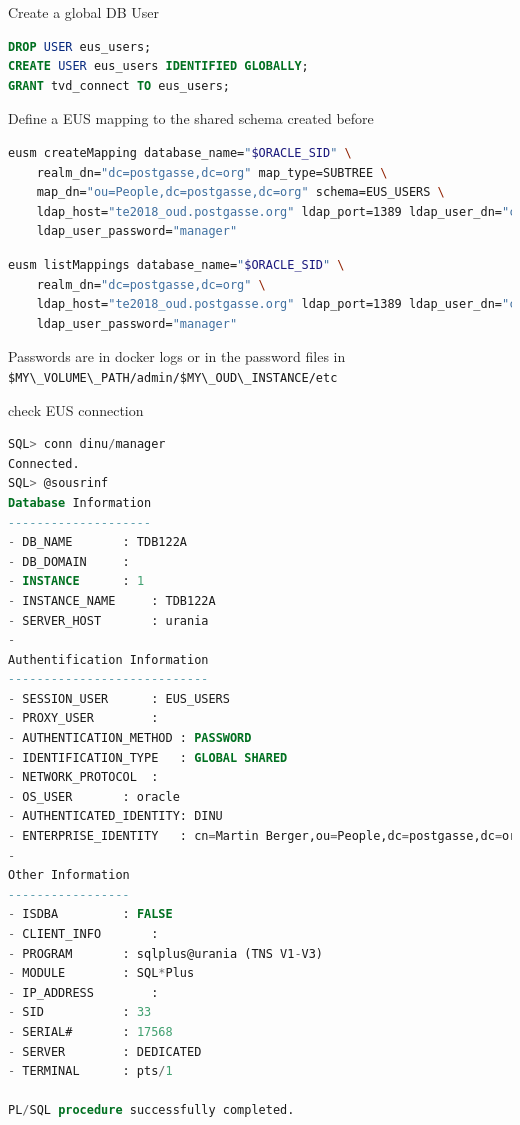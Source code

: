 \documentclass[a4paper,,tablecaptionabove]{scrartcl}
\newcommand{\passthrough}[1]{#1}
\begin{document}
Create a global DB User

\begin{lstlisting}[language=SQL]
DROP USER eus_users;
CREATE USER eus_users IDENTIFIED GLOBALLY;  
GRANT tvd_connect TO eus_users;  
\end{lstlisting}

Define a EUS mapping to the shared schema created before

\begin{lstlisting}[language=bash]
eusm createMapping database_name="$ORACLE_SID" \
    realm_dn="dc=postgasse,dc=org" map_type=SUBTREE \
    map_dn="ou=People,dc=postgasse,dc=org" schema=EUS_USERS \
    ldap_host="te2018_oud.postgasse.org" ldap_port=1389 ldap_user_dn="cn=eusadmin" \
    ldap_user_password="manager"  
\end{lstlisting}

\begin{lstlisting}[language=bash]
eusm listMappings database_name="$ORACLE_SID" \
    realm_dn="dc=postgasse,dc=org" \
    ldap_host="te2018_oud.postgasse.org" ldap_port=1389 ldap_user_dn="cn=eusadmin" \
    ldap_user_password="manager"
\end{lstlisting}

Passwords are in docker logs or in the password files in
\passthrough{\lstinline!$MY\_VOLUME\_PATH/admin/$MY\_OUD\_INSTANCE/etc!}

check EUS connection

\begin{lstlisting}[language=SQL]
SQL> conn dinu/manager
Connected.
SQL> @sousrinf
Database Information
--------------------
- DB_NAME       : TDB122A
- DB_DOMAIN     :
- INSTANCE      : 1
- INSTANCE_NAME     : TDB122A
- SERVER_HOST       : urania
-
Authentification Information
----------------------------
- SESSION_USER      : EUS_USERS
- PROXY_USER        :
- AUTHENTICATION_METHOD : PASSWORD
- IDENTIFICATION_TYPE   : GLOBAL SHARED
- NETWORK_PROTOCOL  :
- OS_USER       : oracle
- AUTHENTICATED_IDENTITY: DINU
- ENTERPRISE_IDENTITY   : cn=Martin Berger,ou=People,dc=postgasse,dc=org
-
Other Information
-----------------
- ISDBA         : FALSE
- CLIENT_INFO       :
- PROGRAM       : sqlplus@urania (TNS V1-V3)
- MODULE        : SQL*Plus
- IP_ADDRESS        :
- SID           : 33
- SERIAL#       : 17568
- SERVER        : DEDICATED
- TERMINAL      : pts/1

PL/SQL procedure successfully completed.
\end{lstlisting}
\end{document}

